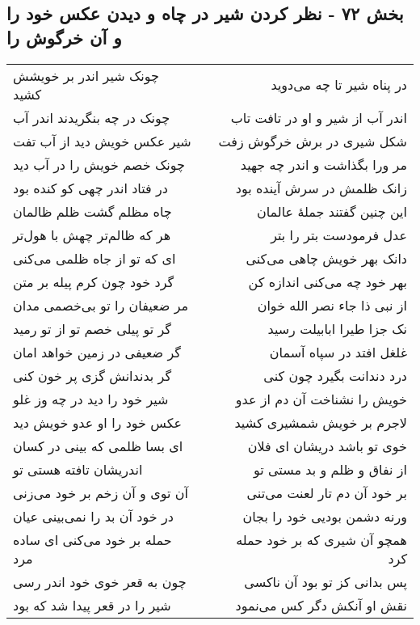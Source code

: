 \begin{center}
\section*{بخش ۷۲ - نظر کردن شیر در چاه و دیدن عکس خود را و آن خرگوش را}
\label{sec:sh072}
\begin{longtable}{l p{0.5cm} r}
چونک شیر اندر بر خویشش کشید
&&
در پناه شیر تا چه می‌دوید
\\
چونک در چه بنگریدند اندر آب
&&
اندر آب از شیر و او در تافت تاب
\\
شیر عکس خویش دید از آب تفت
&&
شکل شیری در برش خرگوش زفت
\\
چونک خصم خویش را در آب دید
&&
مر ورا بگذاشت و اندر چه جهید
\\
در فتاد اندر چهی کو کنده بود
&&
زانک ظلمش در سرش آینده بود
\\
چاه مظلم گشت ظلم ظالمان
&&
این چنین گفتند جملهٔ عالمان
\\
هر که ظالم‌تر چهش با هول‌تر
&&
عدل فرمودست بتر را بتر
\\
ای که تو از جاه ظلمی می‌کنی
&&
دانک بهر خویش چاهی می‌کنی
\\
گرد خود چون کرم پیله بر متن
&&
بهر خود چه می‌کنی اندازه کن
\\
مر ضعیفان را تو بی‌خصمی مدان
&&
از نبی ذا جاء نصر الله خوان
\\
گر تو پیلی خصم تو از تو رمید
&&
نک جزا طیرا ابابیلت رسید
\\
گر ضعیفی در زمین خواهد امان
&&
غلغل افتد در سپاه آسمان
\\
گر بدندانش گزی پر خون کنی
&&
درد دندانت بگیرد چون کنی
\\
شیر خود را دید در چه وز غلو
&&
خویش را نشناخت آن دم از عدو
\\
عکس خود را او عدو خویش دید
&&
لاجرم بر خویش شمشیری کشید
\\
ای بسا ظلمی که بینی در کسان
&&
خوی تو باشد دریشان ای فلان
\\
اندریشان تافته هستی تو
&&
از نفاق و ظلم و بد مستی تو
\\
آن توی و آن زخم بر خود می‌زنی
&&
بر خود آن دم تار لعنت می‌تنی
\\
در خود آن بد را نمی‌بینی عیان
&&
ورنه دشمن بودیی خود را بجان
\\
حمله بر خود می‌کنی ای ساده مرد
&&
همچو آن شیری که بر خود حمله کرد
\\
چون به قعر خوی خود اندر رسی
&&
پس بدانی کز تو بود آن ناکسی
\\
شیر را در قعر پیدا شد که بود
&&
نقش او آنکش دگر کس می‌نمود

\end{longtable}
\end{center}

